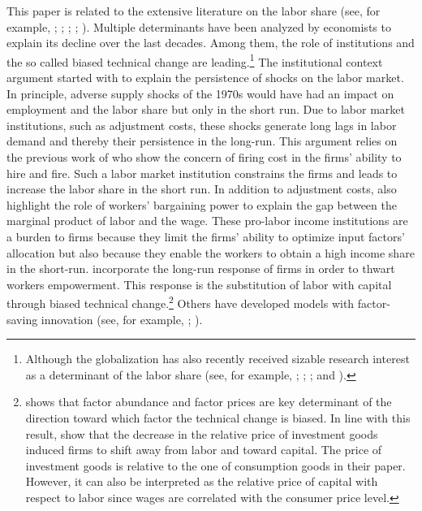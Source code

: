 This paper is related to the extensive literature on the labor share (see, for example, \citealt{Blanchard1997}; \citealt{Caballero1998}; \citealt{Acemoglu2003}; \citealt{Karabarbounis2014}; \citealt{Autor2019}). Multiple determinants have been analyzed by economists to explain its decline over the last decades. Among them, the role of institutions and the so called biased technical change are leading.\footnote{Although the globalization has also recently received sizable research interest as a determinant of the labor share (see, for example, \citealt{Jayadev2007}; \citealt{Pica2010}; \citealt{Young2018}; and \citealt{Autor2019}).}
The institutional context argument started with \cite{Blanchard1997} to explain the persistence of shocks on the labor market. In principle, adverse supply shocks of the 1970s would have had an impact on employment and the labor share but only in the short run. Due to labor market institutions, such as adjustment costs, these shocks generate long lags in labor demand and thereby their persistence in the long-run. This argument relies on the previous work of \cite{Bentolila1990} who show the concern of firing cost in the firms' ability to hire and fire. Such a labor market institution constrains the firms and leads to increase the labor share in the short run. In addition to adjustment costs, \cite{Bentolila2003} also highlight the role of workers' bargaining power to explain the gap between the marginal product of labor and the wage.
These pro-labor income institutions are a burden to firms because they limit the firms' ability to optimize input factors' allocation but also because they enable the workers to obtain a high income share in the short-run. \cite{Caballero1998} incorporate the long-run response of firms in order to thwart workers empowerment. This response is the substitution of labor with capital through biased technical change.\footnote{\cite{Acemoglu2002} shows that factor abundance and factor prices are key determinant of the direction toward which factor the technical change is biased. In line with this result, \cite{Karabarbounis2014} show that the decrease in the relative price of investment goods induced firms to shift away from labor and toward capital. The price of investment goods is relative to the one of consumption goods in their paper. However, it can also be interpreted as the relative price of capital with respect to labor since wages are correlated with the consumer price level.} Others have developed models with factor-saving innovation (see, for example, \citealt{Zuleta2008}; \citealt{Peretto2013}).




